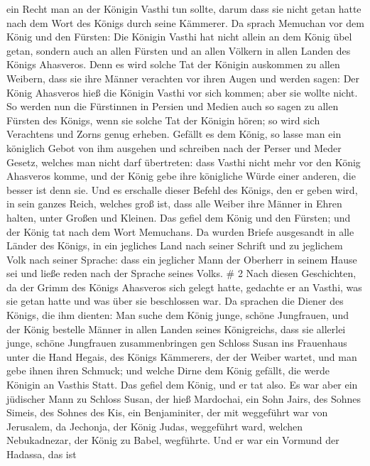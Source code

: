ein Recht man an der Königin Vasthi tun sollte, darum dass sie nicht
getan hatte nach dem Wort des Königs durch seine Kämmerer. 
Da sprach Memuchan vor dem König und den Fürsten: Die Königin Vasthi hat
nicht allein an dem König übel getan, sondern auch an allen Fürsten und
an allen Völkern in allen Landen des Königs Ahasveros. 
Denn es wird solche Tat der Königin auskommen zu allen Weibern, dass sie
ihre Männer verachten vor ihren Augen und werden sagen: Der König
Ahasveros hieß die Königin Vasthi vor sich kommen; aber sie wollte
nicht.  So werden nun die Fürstinnen in Persien und Medien
auch so sagen zu allen Fürsten des Königs, wenn sie solche Tat der
Königin hören; so wird sich Verachtens und Zorns genug erheben.
 Gefällt es dem König, so lasse man ein königlich Gebot von
ihm ausgehen und schreiben nach der Perser und Meder Gesetz, welches man
nicht darf übertreten: dass Vasthi nicht mehr vor den König Ahasveros
komme, und der König gebe ihre königliche Würde einer anderen, die
besser ist denn sie.  Und es erschalle dieser Befehl des
Königs, den er geben wird, in sein ganzes Reich, welches groß ist, dass
alle Weiber ihre Männer in Ehren halten, unter Großen und Kleinen.
 Das gefiel dem König und den Fürsten; und der König tat
nach dem Wort Memuchans.  Da wurden Briefe ausgesandt in
alle Länder des Königs, in ein jegliches Land nach seiner Schrift und zu
jeglichem Volk nach seiner Sprache: dass ein jeglicher Mann der Oberherr
in seinem Hause sei und ließe reden nach der Sprache seines Volks. \# 2
 Nach diesen Geschichten, da der Grimm des Königs Ahasveros
sich gelegt hatte, gedachte er an Vasthi, was sie getan hatte und was
über sie beschlossen war.  Da sprachen die Diener des
Königs, die ihm dienten: Man suche dem König junge, schöne Jungfrauen,
 und der König bestelle Männer in allen Landen seines
Königreichs, dass sie allerlei junge, schöne Jungfrauen zusammenbringen
gen Schloss Susan ins Frauenhaus unter die Hand Hegais, des Königs
Kämmerers, der der Weiber wartet, und man gebe ihnen ihren Schmuck;
 und welche Dirne dem König gefällt, die werde Königin an
Vasthis Statt. Das gefiel dem König, und er tat also.  Es
war aber ein jüdischer Mann zu Schloss Susan, der hieß Mardochai, ein
Sohn Jairs, des Sohnes Simeis, des Sohnes des Kis, ein Benjaminiter,
 der mit weggeführt war von Jerusalem, da Jechonja, der
König Judas, weggeführt ward, welchen Nebukadnezar, der König zu Babel,
wegführte.  Und er war ein Vormund der Hadassa, das ist
